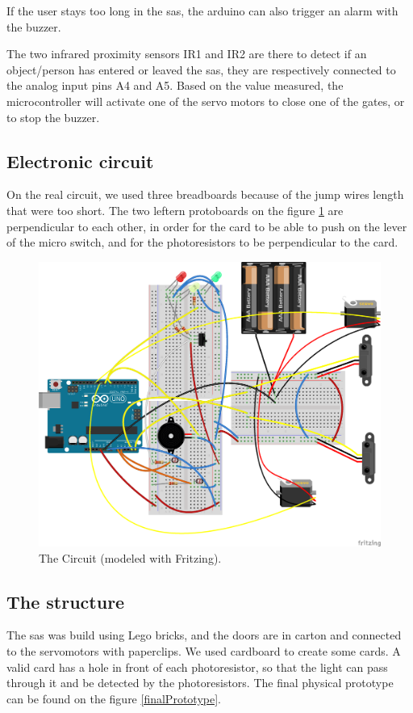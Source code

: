 If the user stays too long in the sas, the arduino can also trigger an alarm with the buzzer.

The two infrared proximity sensors IR1 and IR2 are there to detect if an object/person has entered or leaved the sas, they are respectively connected to the analog input pins A4 and A5. Based on the value measured, the microcontroller will activate one of the servo motors to close one of the gates, or to stop the buzzer.

\subsection{Electronic circuit}
On the real circuit, we used three breadboards because of the jump wires length that were too short. The two leftern protoboards on the figure \ref{circuit} are perpendicular to each other, in order for the card to be able to push on the lever of the micro switch, and for the photoresistors to be perpendicular to the card.

\begin{figure}[!h]
	\centering
    \includegraphics[scale=0.5]{ElectronicScheme2.png}
    \caption{The Circuit (modeled with Fritzing).}
    \label{circuit}
\end{figure}

\subsection{The structure}
The sas was build using Lego bricks, and the doors are in carton and connected to the servomotors with paperclips. We used cardboard to create some cards. A valid card has a hole in front of each photoresistor, so that the light can pass through it and be detected by the photoresistors. The final physical prototype can be found on the figure \ref{finalPrototype}.

